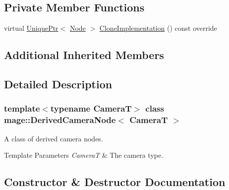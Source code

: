 \subsection*{Private Member Functions}
\begin{DoxyCompactItemize}
\item 
virtual \hyperlink{namespacemage_a3316d7143a973e37adf1110f2e80ca31}{Unique\+Ptr}$<$ \hyperlink{classmage_1_1_node}{Node} $>$ \hyperlink{classmage_1_1_derived_camera_node_aa965751029ebd6b41d3805b499a8304e}{Clone\+Implementation} () const override
\end{DoxyCompactItemize}
\subsection*{Additional Inherited Members}


\subsection{Detailed Description}
\subsubsection*{template$<$typename CameraT$>$\newline
class mage\+::\+Derived\+Camera\+Node$<$ Camera\+T $>$}

A class of derived camera nodes.


\begin{DoxyTemplParams}{Template Parameters}
{\em CameraT} & The camera type. \\
\hline
\end{DoxyTemplParams}


\subsection{Constructor \& Destructor Documentation}
\hypertarget{classmage_1_1_derived_camera_node_a782a23d04ba78be88b0f73d9dde4552f}{}\label{classmage_1_1_derived_camera_node_a782a23d04ba78be88b0f73d9dde4552f} 
